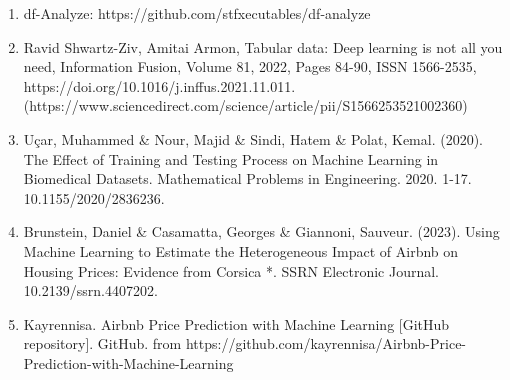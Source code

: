 \documentclass[a4paper,12pt]{article}
\begin{document}
\begin{enumerate}
  \item df-Analyze: https://github.com/stfxecutables/df-analyze
  \item Ravid Shwartz-Ziv, Amitai Armon, Tabular data: Deep learning is not all you need, Information Fusion, Volume 81, 2022, Pages 84-90, ISSN 1566-2535, https://doi.org/10.1016/j.inffus.2021.11.011. (https://www.sciencedirect.com/science/article/pii/S1566253521002360)
  \item Uçar, Muhammed \& Nour, Majid \& Sindi, Hatem \& Polat, Kemal. (2020). The Effect of Training and Testing Process on Machine Learning in Biomedical Datasets. Mathematical Problems in Engineering. 2020. 1-17. 10.1155/2020/2836236. 
  \item Brunstein, Daniel \& Casamatta, Georges \& Giannoni, Sauveur. (2023). Using Machine Learning to Estimate the Heterogeneous Impact of Airbnb on Housing Prices: Evidence from Corsica *. SSRN Electronic Journal. 10.2139/ssrn.4407202. 
  \item Kayrennisa. Airbnb Price Prediction with Machine Learning [GitHub repository]. GitHub. from https://github.com/kayrennisa/Airbnb-Price-Prediction-with-Machine-Learning
\end{enumerate}
\end{document}
